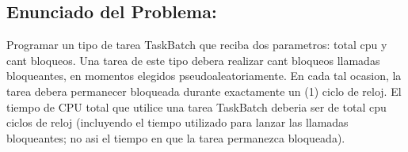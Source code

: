 \subsection{Enunciado del Problema:}

Programar un tipo de tarea TaskBatch que reciba dos parametros: total cpu y cant bloqueos. Una tarea de este tipo debera realizar cant bloqueos llamadas bloqueantes, en momentos elegidos pseudoaleatoriamente. En cada tal ocasion, la tarea debera permanecer bloqueada durante exactamente un (1) ciclo de reloj. El tiempo de CPU total que utilice una tarea TaskBatch deberia ser de total cpu ciclos de reloj (incluyendo el tiempo utilizado para lanzar las llamadas bloqueantes; no asi el tiempo en que la tarea permanezca bloqueada).